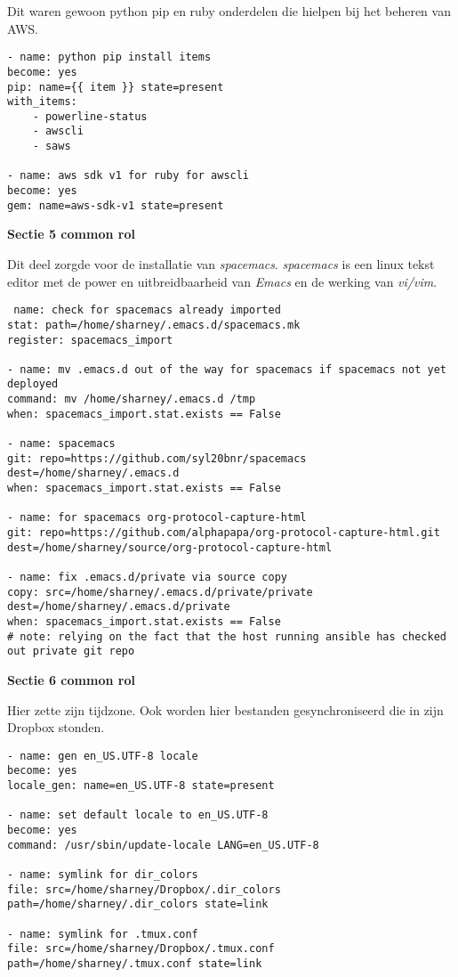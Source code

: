 Dit waren gewoon python pip en ruby onderdelen die hielpen bij het beheren van AWS.
\begin{lstlisting}
- name: python pip install items
become: yes
pip: name={{ item }} state=present
with_items:
    - powerline-status
    - awscli
    - saws

- name: aws sdk v1 for ruby for awscli
become: yes
gem: name=aws-sdk-v1 state=present
\end{lstlisting}

\textbf{Sectie 5 common rol}

Dit deel zorgde voor de installatie van \textit{spacemacs}. \textit{spacemacs} is een linux tekst editor met de power en uitbreidbaarheid van \textit{Emacs} en de werking van \textit{vi/vim}.
\begin{lstlisting}
 name: check for spacemacs already imported
stat: path=/home/sharney/.emacs.d/spacemacs.mk
register: spacemacs_import

- name: mv .emacs.d out of the way for spacemacs if spacemacs not yet deployed
command: mv /home/sharney/.emacs.d /tmp
when: spacemacs_import.stat.exists == False

- name: spacemacs
git: repo=https://github.com/syl20bnr/spacemacs dest=/home/sharney/.emacs.d 
when: spacemacs_import.stat.exists == False

- name: for spacemacs org-protocol-capture-html
git: repo=https://github.com/alphapapa/org-protocol-capture-html.git dest=/home/sharney/source/org-protocol-capture-html

- name: fix .emacs.d/private via source copy
copy: src=/home/sharney/.emacs.d/private/private dest=/home/sharney/.emacs.d/private
when: spacemacs_import.stat.exists == False
# note: relying on the fact that the host running ansible has checked out private git repo
\end{lstlisting}

\textbf{Sectie 6 common rol}

Hier zette \autocite{commonscottharney} zijn tijdzone. Ook worden hier bestanden gesynchroniseerd die in zijn Dropbox stonden.
\begin{lstlisting}
- name: gen en_US.UTF-8 locale
become: yes
locale_gen: name=en_US.UTF-8 state=present

- name: set default locale to en_US.UTF-8
become: yes
command: /usr/sbin/update-locale LANG=en_US.UTF-8

- name: symlink for dir_colors
file: src=/home/sharney/Dropbox/.dir_colors path=/home/sharney/.dir_colors state=link

- name: symlink for .tmux.conf
file: src=/home/sharney/Dropbox/.tmux.conf path=/home/sharney/.tmux.conf state=link
\end{lstlisting}

